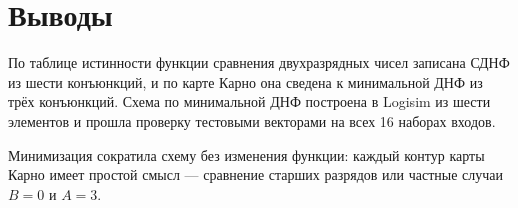 \section{Выводы}
По таблице истинности функции сравнения двухразрядных чисел записана СДНФ из шести
конъюнкций, и по карте Карно она сведена к минимальной ДНФ из трёх конъюнкций. Схема по
минимальной ДНФ построена в Logisim из шести элементов и прошла проверку тестовыми векторами
на всех 16 наборах входов.

Минимизация сократила схему без изменения функции: каждый контур карты Карно имеет простой
смысл — сравнение старших разрядов или частные случаи $B = 0$ и $A = 3$.
